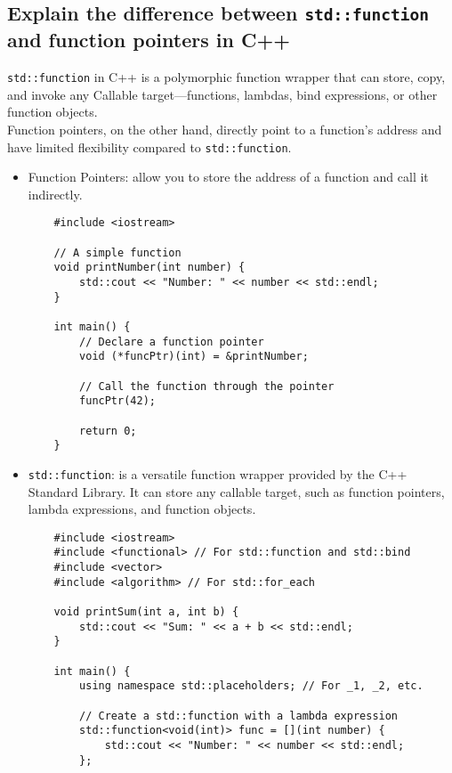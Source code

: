 \subsection{Explain the difference between \texttt{std::function} and function pointers in C++}
\texttt{std::function} in C++ is a polymorphic function wrapper that can store, copy, and invoke any Callable target—functions, lambdas, bind expressions, or other function objects. \\ 
Function pointers, on the other hand, directly point to a function's address and have limited flexibility compared to \texttt{std::function}.
\begin{itemize}
    \item Function Pointers: allow you to store the address of a function and call it indirectly.
    \begin{tcolorbox}[title=Function Pointer]
    \begin{verbatim}
    #include <iostream>

    // A simple function
    void printNumber(int number) {
        std::cout << "Number: " << number << std::endl;
    }
    
    int main() {
        // Declare a function pointer
        void (*funcPtr)(int) = &printNumber;
    
        // Call the function through the pointer
        funcPtr(42);
    
        return 0;
    }
    \end{verbatim}
    \end{tcolorbox}
    \item \texttt{std::function}: is a versatile function wrapper provided by the C++ Standard Library. It can store any callable target, such as function pointers, lambda expressions, and function objects.
    \begin{tcolorbox}[title=\texttt{std::function}]
    \begin{verbatim}
    #include <iostream>
    #include <functional> // For std::function and std::bind
    #include <vector>
    #include <algorithm> // For std::for_each
    
    void printSum(int a, int b) {
        std::cout << "Sum: " << a + b << std::endl;
    }
    
    int main() {
        using namespace std::placeholders; // For _1, _2, etc.
    
        // Create a std::function with a lambda expression
        std::function<void(int)> func = [](int number) {
            std::cout << "Number: " << number << std::endl;
        };
    

\end{verbatim}
\end{tcolorbox}
\end{itemize}
